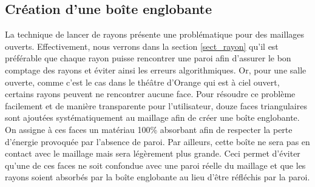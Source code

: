 \subsection{Création d'une boîte englobante} \label{sect_boîteenglobante}

La technique de lancer de rayons présente une problématique pour des maillages ouverts. Effectivement, nous verrons dans la section \ref{sect_rayon} qu'il est préférable que chaque rayon puisse rencontrer une paroi afin d'assurer le bon comptage des rayons et éviter ainsi les erreurs algorithmiques. Or, pour une salle ouverte, comme c'est le cas dans le théâtre d'Orange qui est à ciel ouvert, certains rayons peuvent ne rencontrer aucune face. Pour résoudre ce problème facilement et de manière transparente pour l'utilisateur, douze faces triangulaires sont ajoutées systématiquement au maillage afin de créer une boîte englobante. On assigne à ces faces un matériau 100\% absorbant afin de respecter la perte d'énergie provoquée par l'absence de paroi. Par ailleurs, cette boîte ne sera pas en contact avec le maillage mais sera légèrement plus grande. Ceci permet d'éviter qu'une de ces faces ne soit confondue avec une paroi réelle du maillage et que les rayons soient absorbés par la boîte englobante au lieu d'être réfléchis par la paroi.

